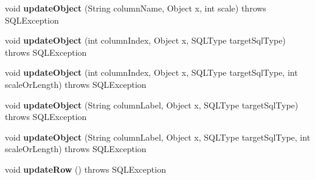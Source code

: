 \begin{DoxyCompactItemize}
\mbox{\label{classcom_1_1mysql_1_1cj_1_1jdbc_1_1result_1_1_updatable_result_set_a77b819dbee8b4636ab5b885dd2613d47}} 
void {\bfseries update\+Object} (String column\+Name, Object x, int scale)  throws S\+Q\+L\+Exception 
\item 
\mbox{\label{classcom_1_1mysql_1_1cj_1_1jdbc_1_1result_1_1_updatable_result_set_a73bf4b782f6e4de1d3ce6ab8015d4e98}} 
void {\bfseries update\+Object} (int column\+Index, Object x, S\+Q\+L\+Type target\+Sql\+Type)  throws S\+Q\+L\+Exception 
\item 
\mbox{\label{classcom_1_1mysql_1_1cj_1_1jdbc_1_1result_1_1_updatable_result_set_af5cd8ea155e9a738bc7d717526cb69c3}} 
void {\bfseries update\+Object} (int column\+Index, Object x, S\+Q\+L\+Type target\+Sql\+Type, int scale\+Or\+Length)  throws S\+Q\+L\+Exception 
\item 
\mbox{\label{classcom_1_1mysql_1_1cj_1_1jdbc_1_1result_1_1_updatable_result_set_aca20d27ed3a2382009d56f0fa57483ce}} 
void {\bfseries update\+Object} (String column\+Label, Object x, S\+Q\+L\+Type target\+Sql\+Type)  throws S\+Q\+L\+Exception 
\item 
\mbox{\label{classcom_1_1mysql_1_1cj_1_1jdbc_1_1result_1_1_updatable_result_set_a2557907ee4b44655c137b56708565db4}} 
void {\bfseries update\+Object} (String column\+Label, Object x, S\+Q\+L\+Type target\+Sql\+Type, int scale\+Or\+Length)  throws S\+Q\+L\+Exception 
\item 
\mbox{\label{classcom_1_1mysql_1_1cj_1_1jdbc_1_1result_1_1_updatable_result_set_a929a525bf0cd169280f2395c1976352e}} 
void {\bfseries update\+Row} ()  throws S\+Q\+L\+Exception 
\item 
\mbox{\label{classcom_1_1mysql_1_1cj_1_1jdbc_1_1result_1_1_updatable_result_set_a92a643f0027e935caeaa9a2430a83aeb}} 

\end{DoxyCompactItemize}
